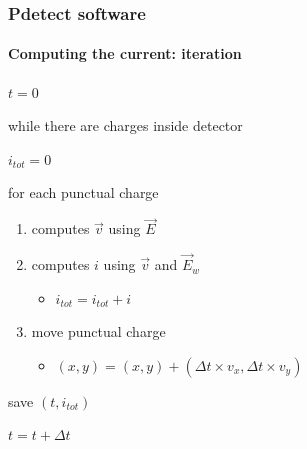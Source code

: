 \documentclass[14pt]{beamer}
\begin{document}
\begin{frame}
  \frametitle{Pdetect software}
  \framesubtitle{Computing the current: iteration}

$t=0$

while there are charges inside detector

\hspace{0.5cm} $i_{tot} = 0$

\hspace{0.5cm} for each punctual charge
\begin{enumerate}
  \addtolength{\itemindent}{1cm}
  \item computes $\vec{v}$ using $\vec{E}$
  \item computes $i$ using $\vec{v}$ and $\vec{E}_w$
  \begin{itemize}
    \item $i_{tot} = i_{tot}+i$
  \end{itemize}
  \item move punctual charge
  \begin{itemize}
    \item $(x,y) = (x,y) + (\Delta t \times v_x, \Delta t \times v_y)$
  \end{itemize}
\end{enumerate}

\hspace{0.5cm} save $(t,i_{tot})$

\hspace{0.5cm} $t = t+\Delta t$

\end{frame}




\end{document}
